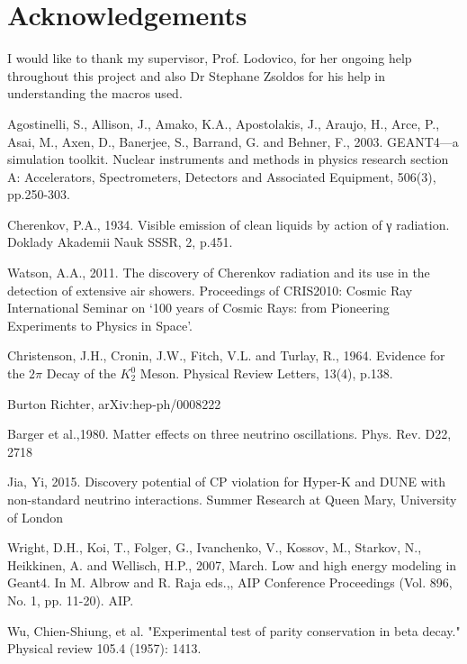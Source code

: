 \documentclass[11pt,oneside,a4paper]{article}
\begin{document}
\section{Acknowledgements}
I would like to thank my supervisor, Prof. Lodovico, for her ongoing help throughout this project and also Dr Stephane Zsoldos for his help in understanding the macros used.



\begin{thebibliography}{99}
Agostinelli, S., Allison, J., Amako, K.A., Apostolakis, J., Araujo, H., Arce, P., Asai, M., Axen, D., Banerjee, S., Barrand, G. and Behner, F., 2003. GEANT4—a simulation toolkit. Nuclear instruments and methods in physics research section A: Accelerators, Spectrometers, Detectors and Associated Equipment, 506(3), pp.250-303.

Cherenkov, P.A., 1934. Visible emission of clean liquids by action of γ radiation. Doklady Akademii Nauk SSSR, 2, p.451.

Watson, A.A., 2011. The discovery of Cherenkov radiation and its use in the detection of extensive air showers. Proceedings of CRIS2010: Cosmic Ray International Seminar on ‘100 years of Cosmic Rays: from Pioneering Experiments to Physics in Space’.

Christenson, J.H., Cronin, J.W., Fitch, V.L. and Turlay, R., 1964. Evidence for the $2{\pi}$ Decay of the $K_2^0$  Meson. Physical Review Letters, 13(4), p.138.

Burton Richter, arXiv:hep-ph/0008222

Barger et al.,1980. Matter effects on three neutrino oscillations. Phys. Rev. D22, 2718

Jia, Yi, 2015. Discovery potential of CP violation for Hyper-K and DUNE with non-standard neutrino interactions. Summer Research at Queen Mary, University of London

Wright, D.H., Koi, T., Folger, G., Ivanchenko, V., Kossov, M., Starkov, N., Heikkinen, A. and Wellisch, H.P., 2007, March. Low and high energy modeling in Geant4. In M. Albrow and R. Raja eds.,, AIP Conference Proceedings (Vol. 896, No. 1, pp. 11-20). AIP.

Wu, Chien-Shiung, et al. "Experimental test of parity conservation in beta decay." Physical review 105.4 (1957): 1413.

  
\end{thebibliography}
\end{document}

